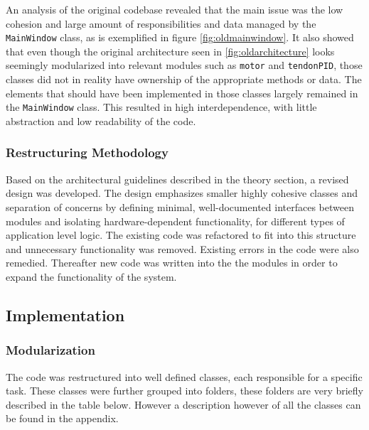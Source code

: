 An analysis of the original codebase revealed that the main issue was the low cohesion and large amount of responsibilities and data managed by the \texttt{MainWindow} class, as is exemplified in figure \ref{fig:oldmainwindow}. It also showed that even though the original architecture seen in \ref{fig:oldarchitecture} looks seemingly modularized into relevant modules such as \texttt{motor} and \texttt{tendonPID}, those classes did not in reality have ownership of the appropriate methods or data. The elements that should have been implemented in those classes largely remained in the \texttt{MainWindow} class. This resulted in high interdependence, with little abstraction and low readability of the code.

\subsubsection{Restructuring Methodology}
Based on the architectural guidelines described in the theory section, a revised design was developed. The design emphasizes smaller highly cohesive classes and separation of concerns by defining minimal, well-documented interfaces between modules and isolating hardware-dependent functionality, for different types of application level logic. The existing code was refactored to fit into this structure and unnecessary functionality was removed. Existing errors in the code were also remedied. Thereafter new code was written into the the modules in order to expand the functionality of the system.

\subsection{Implementation}

\subsubsection{Modularization}
The code was restructured into well defined classes, each responsible for a specific task. These classes were further grouped into folders, these folders are very briefly described in the table below. However a description however of all the classes can be found in the appendix. 

